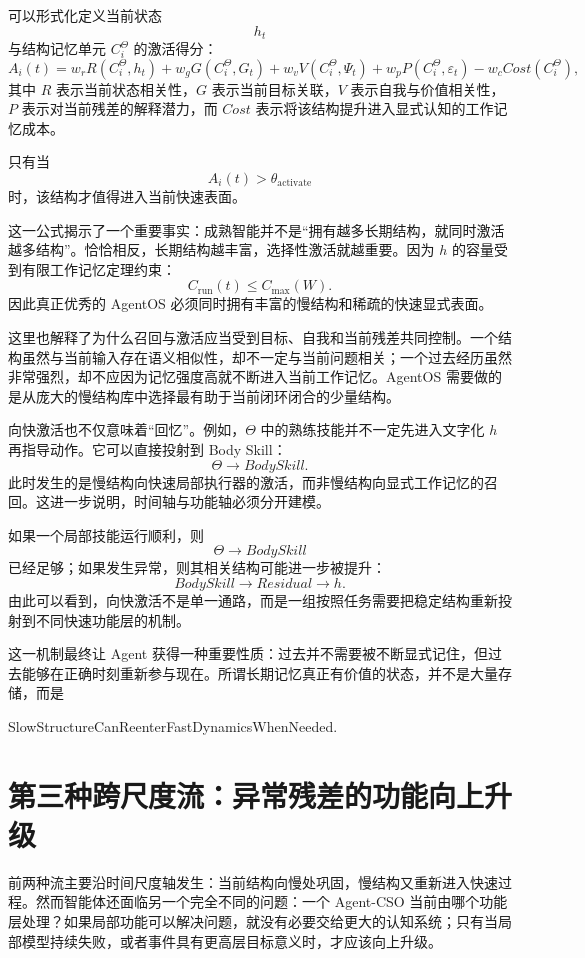 可以形式化定义当前状态
\[
h_t
\]
与结构记忆单元 $C_i^\Theta$ 的激活得分：
\[
A_i(t)
=
w_rR(C_i^\Theta,h_t)
+
w_gG(C_i^\Theta,G_t)
+
w_vV(C_i^\Theta,\Psi_t)
+
w_pP(C_i^\Theta,\varepsilon_t)
-
w_cCost(C_i^\Theta),
\]
其中 $R$ 表示当前状态相关性，$G$ 表示当前目标关联，$V$ 表示自我与价值相关性，$P$ 表示对当前残差的解释潜力，而 $Cost$ 表示将该结构提升进入显式认知的工作记忆成本。

只有当
\[
A_i(t)>\theta_{\mathrm{activate}}
\]
时，该结构才值得进入当前快速表面。

这一公式揭示了一个重要事实：成熟智能并不是“拥有越多长期结构，就同时激活越多结构”。恰恰相反，长期结构越丰富，选择性激活就越重要。因为 $h$ 的容量受到有限工作记忆定理约束：
\[
C_{\mathrm{run}}(t)\le C_{\max}(W).
\]
因此真正优秀的 AgentOS 必须同时拥有丰富的慢结构和稀疏的快速显式表面。

这里也解释了为什么召回与激活应当受到目标、自我和当前残差共同控制。一个结构虽然与当前输入存在语义相似性，却不一定与当前问题相关；一个过去经历虽然非常强烈，却不应因为记忆强度高就不断进入当前工作记忆。AgentOS 需要做的是从庞大的慢结构库中选择最有助于当前闭环闭合的少量结构。

向快激活也不仅意味着“回忆”。例如，$\Theta$ 中的熟练技能并不一定先进入文字化 $h$ 再指导动作。它可以直接投射到 Body Skill：
\[
\Theta
\rightarrow
BodySkill.
\]
此时发生的是慢结构向快速局部执行器的激活，而非慢结构向显式工作记忆的召回。这进一步说明，时间轴与功能轴必须分开建模。

如果一个局部技能运行顺利，则
\[
\Theta\rightarrow BodySkill
\]
已经足够；如果发生异常，则其相关结构可能进一步被提升：
\[
BodySkill
\rightarrow
Residual
\rightarrow
h.
\]
由此可以看到，向快激活不是单一通路，而是一组按照任务需要把稳定结构重新投射到不同快速功能层的机制。

这一机制最终让 Agent 获得一种重要性质：过去并不需要被不断显式记住，但过去能够在正确时刻重新参与现在。所谓长期记忆真正有价值的状态，并不是大量存储，而是
\begin{statementbox}
SlowStructureCanReenterFastDynamicsWhenNeeded.
\end{statementbox}


\section{第三种跨尺度流：异常残差的功能向上升级}

前两种流主要沿时间尺度轴发生：当前结构向慢处巩固，慢结构又重新进入快速过程。然而智能体还面临另一个完全不同的问题：一个 Agent-CSO 当前由哪个功能层处理？如果局部功能可以解决问题，就没有必要交给更大的认知系统；只有当局部模型持续失败，或者事件具有更高层目标意义时，才应该向上升级。

